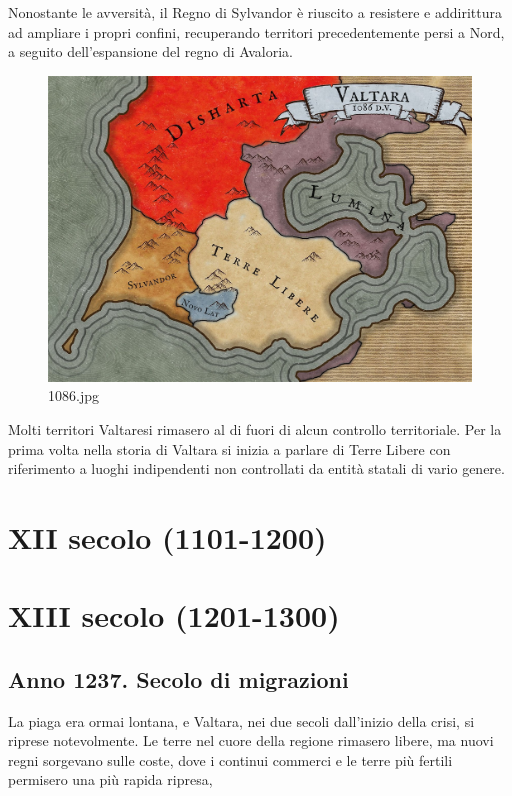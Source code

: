 Nonostante le avversità, il Regno di Sylvandor è riuscito a resistere e
addirittura ad ampliare i propri confini, recuperando territori
precedentemente persi a Nord, a seguito dell'espansione del regno di
Avaloria.

\begin{figure}
\centering
\includegraphics{1086.jpg}
\caption{1086.jpg}
\end{figure}

Molti territori Valtaresi rimasero al di fuori di alcun controllo
territoriale. Per la prima volta nella storia di Valtara si inizia a
parlare di Terre Libere con riferimento a luoghi indipendenti non
controllati da entità statali di vario genere.

\section{XII secolo (1101-1200)}\label{xii-secolo-1101-1200}

\section{XIII secolo (1201-1300)}\label{xiii-secolo-1201-1300}

\subsection{Anno 1237. Secolo di
migrazioni}\label{anno-1237.-secolo-di-migrazioni}

La piaga era ormai lontana, e Valtara, nei due secoli dall'inizio della
crisi, si riprese notevolmente. Le terre nel cuore della regione
rimasero libere, ma nuovi regni sorgevano sulle coste, dove i continui
commerci e le terre più fertili permisero una più rapida ripresa,

